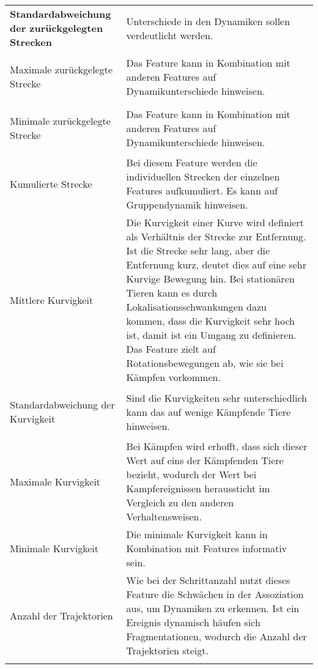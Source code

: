 \begin{longtable}{>{\bfseries}p{} p{}}
Standardabweichung der zurückgelegten Strecken & Unterschiede in den Dynamiken sollen verdeutlicht werden. \\
\addlinespace[0.7em] %

Maximale zurückgelegte Strecke & Das Feature kann in Kombination mit anderen Features auf Dynamikunterschiede hinweisen. \\
\addlinespace[0.7em] %

Minimale zurückgelegte Strecke & Das Feature kann in Kombination mit anderen Features auf Dynamikunterschiede hinweisen. \\
\addlinespace[0.7em] %

Kumulierte Strecke & Bei diesem Feature werden die individuellen Strecken der einzelnen Features aufkumuliert. Es kann auf Gruppendynamik hinweisen. \\
\addlinespace[0.7em] %

Mittlere Kurvigkeit & Die Kurvigkeit einer Kurve wird definiert als Verhältnis der Strecke zur Entfernung. Ist die Strecke sehr lang, aber die Entfernung kurz, deutet dies auf eine sehr Kurvige Bewegung hin. Bei stationären Tieren kann es durch Lokalisationsschwankungen dazu kommen, dass die Kurvigkeit sehr hoch ist, damit ist ein Umgang zu definieren. Das Feature zielt auf Rotationsbewegungen ab, wie sie bei Kämpfen vorkommen.  \\
\addlinespace[0.7em] %

Standardabweichung der Kurvigkeit & Sind die Kurvigkeiten sehr unterschiedlich kann das auf wenige Kämpfende Tiere hinweisen. \\
\addlinespace[0.7em] %

Maximale Kurvigkeit & Bei Kämpfen wird erhofft, dass sich dieser Wert auf eins der Kämpfenden Tiere bezieht, wodurch der Wert bei Kampfereignissen heraussticht im Vergleich zu den anderen Verhaltensweisen. \\
\addlinespace[0.7em] %

Minimale Kurvigkeit & Die minimale Kurvigkeit kann in Kombination mit Features informativ sein.   \\
\addlinespace[0.7em] %

Anzahl der Trajektorien & Wie bei der Schrittanzahl nutzt dieses Feature die Schwächen in der Assoziation aus, um Dynamiken zu erkennen. Ist ein Ereignis dynamisch häufen sich Fragmentationen, wodurch die Anzahl der Trajektorien steigt.  \\
\addlinespace[0.7em] %



\end{longtable}
